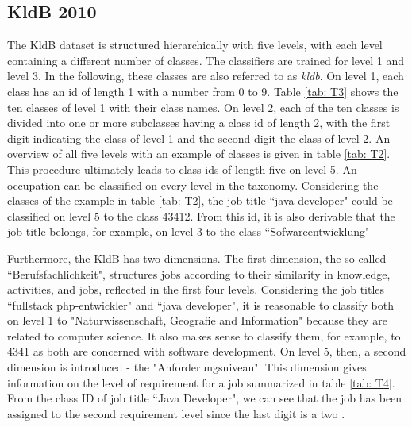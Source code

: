 \documentclass[12pt, a4paper, titlepage]{article}
\begin{document}
\subsection{KldB 2010}
The \ac{KldB} dataset is structured hierarchically with five levels, with each level containing a different number of classes. The classifiers are trained for level 1 and level 3. In the following, these classes are also referred to as \textit{kldb}. On level 1, each class has an id of length 1 with a number from 0 to 9. Table \ref{tab: T3} shows the ten classes of level 1 with their class names. On level 2, each of the ten classes is divided into one or more subclasses having a class id of length 2, with the first digit indicating the class of level 1 and the second digit the class of level 2. An overview of all five levels with an example of classes is given in table \ref{tab: T2}. This procedure ultimately leads to class ids of length five on level 5. An occupation can be classified on every level in the taxonomy. Considering the classes of the example in table \ref{tab: T2}, the job title ``java developer" could be classified on level 5 to the class 43412. From this id, it is also derivable that the job title belongs, for example, on level 3 to the class ``Sofwareentwicklung" \citep{Bundesagentur2011a, Bundesagentur2011b, Paulus2013}

Furthermore, the \ac{KldB} has two dimensions. The first dimension, the so-called ``Berufsfachlichkeit", structures jobs according to their similarity in knowledge, activities, and jobs, reflected in the first four levels. Considering the job titles ``fullstack php-entwickler" and ``java developer", it is reasonable to classify both on level 1 to "Naturwissenschaft, Geografie and Information" because they are related to computer science. It also makes sense to classify them, for example, to 4341 as both are concerned with software development. On level 5, then, a second dimension is introduced - the "Anforderungsniveau". This dimension gives information on the level of requirement for a job summarized in table \ref{tab: T4}. From the class ID of job title ``Java Developer", we can see that the job has been assigned to the second requirement level since the last digit is a two \citep{Bundesagentur2011a, Bundesagentur2011b, Paulus2013}. 
\end{document}
